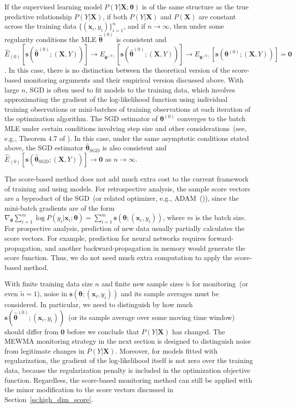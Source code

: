 \documentclass[twoside,11pt]{article}
\begin{document}
If the supervised learning model $P(Y|\bm{X};\bm{\theta})$ is of the same structure as the true predictive relationship $P(Y|\bm{X})$, if both $P(Y|\bm{X})$ and $P(\bm{X})$ are constant across the training data $\{(\bm{x}_i, y_i)\}_{i=1}^n$, and if $n \to \infty$, then under some regularity conditions the MLE $\hat{\bm { \theta}} ^{ (0)}$ is consistent and  $\hat{E}_{(0)} [\bm{s}(\hat{\bm { \theta}} ^{ (0)};(\bm {X}, Y))] \to E_{\bm { \theta} ^{ (0)}}[\bm{s}(\hat{\bm { \theta}} ^{ (0)};(\bm {X}, Y))] \to E_{\bm { \theta} ^{ (0)}}[\bm{s}(\bm { \theta} ^{ (0)};(\bm {X}, Y))] = \bm {0}$. In this case, there is no distinction between the theoretical version of the score-based monitoring arguments and their empirical version discussed above. With large $n$, SGD is often used to fit models to the training data, which involves approximating the gradient of the log-likelihood function using individual training observations or mini-batches of training observations at each iteration of the optimization algorithm. The SGD estimator of $\bm { \theta} ^{ (0)}$ converges to the batch MLE under certain conditions involving step size and other considerations~(see, e.g., Theorem 4.7 of \cite{bottou2018optimization}). In this case, under the same asymptotic conditions stated above, the SGD estimator $\hat {\bm { \theta}}_{\mathrm{SGD}}$ is also consistent and $\hat{E}_{(0)} [\bm{s}(\hat{\bm { \theta}}_{\mathrm{SGD}};(\bm {X}, Y))] \to \bm{0}$ as $n \to \infty$. 

The score-based method does not add much extra cost to the current framework of training and using models. For retrospective analysis, the sample score vectors are a byproduct of the SGD~(or related optimizer, e.g., ADAM~(\cite{kingma2014adam})), since the mini-batch gradients are of the form $\nabla _{\bm { \theta}} \sum _{i=1} ^{m} \log{P(y_i|\bm {x}_i;\bm{\theta})} = \sum _{i=1} ^{m} \bm{s}(\bm { \theta};(\bm {x}_i, y_i))$, where $m$ is the batch size. For prospective analysis, prediction of new data usually partially calculates the score vectors. For example, prediction for neural networks requires forward-propagation, and another backward-propagation in memory would generate the score function. Thus, we do not need much extra computation to apply the score-based method.

With finite training data size $n$ and finite new sample sizes $\tilde{n}$ for monitoring~(or even $\tilde{n}=1$), noise in $\bm{s}(\bm { \theta};(\bm {x}_i, y_i))$ and its sample averages must be considered. In particular, we need to distinguish by how much $\bm{s}(\hat{\bm { \theta}}^{(0)};(\bm {x}_i, y_i))$~(or its sample average over some moving time window) should differ from $\bm{0}$ before we conclude that $P(Y|\bm{X})$ has changed. The MEWMA monitoring strategy in the next section is designed to distinguish noise from legitimate changes in $P(Y|\bm{X})$. Moreover, for models fitted with regularization, the gradient of the log-likelihood itself is not zero over the training data, because the regularization penalty is included in the optimization objective function. Regardless, the score-based monitoring method can still be applied with the minor modification to the score vectors discussed in Section~\ref{ss:high_dim_score}.
\end{document}
